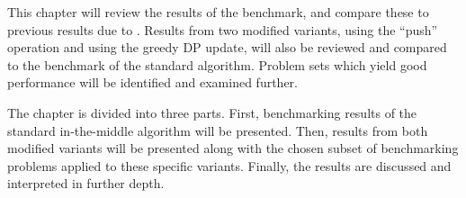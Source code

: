 This chapter will review the results of the benchmark, and compare these to previous results due to \textcite{deGivry14}.
Results from two modified variants, using the \enquote{push} operation and using the greedy DP update, will also be reviewed and compared to the benchmark of the standard algorithm.
Problem sets which yield good performance will be identified and examined further.

The chapter is divided into three parts.
First, benchmarking results of the standard in-the-middle algorithm will be presented.
Then, results from both modified variants will be presented along with the chosen subset of benchmarking problems applied to these specific variants.
Finally, the results are discussed and interpreted in further depth.
